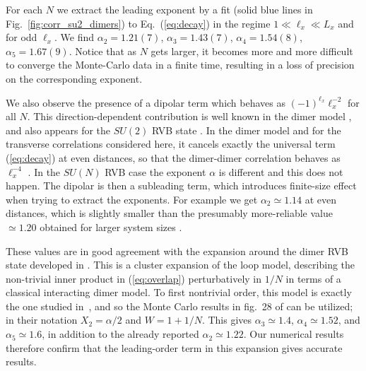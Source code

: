 \documentclass[11pt]{iopart}
\begin{document}
For each $N$ we extract the leading exponent by a fit (solid blue lines in Fig.~\ref{fig:corr_su2_dimers}) to Eq.~(\ref{eq:decay}) in the regime $1\ll \ell_x \ll L_x$ and for odd $\ell_x$. We find $\alpha_2=1.21(7)$, $\alpha_3=1.43(7)$, $\alpha_4=1.54(8)$, $\alpha_5=1.67(9)$. Notice that as $N$ gets larger, it becomes more and more difficult to converge the Monte-Carlo data in a finite time, resulting in a loss of precision on the corresponding exponent. 

We also observe the presence of a dipolar term which behaves as $(-1)^{\ell_x} \ell_x^{-2}$ for all $N$. This direction-dependent contribution is well known in the dimer model \cite{Alet_dimers2}, and also appears for the $SU(2)$ RVB state \cite{RVB2}. In the dimer model and for the transverse correlations considered here, it cancels exactly the universal term (\ref{eq:decay}) at even distances, so that the dimer-dimer correlation behaves as $\ell_x^{-4}$ \cite{FisherStephenson}. In the $SU(N)$ RVB case the exponent $\alpha$ is different and this does not happen. The dipolar is then a subleading term, which introduces finite-size effect when trying to extract the exponents. For example we get $\alpha_2\simeq 1.14$ at even distances, which is slightly smaller than the presumably more-reliable value $\simeq 1.20$ obtained for larger system sizes \cite{RVB1,RVB2}.

These values are in good agreement with the expansion around the dimer RVB state developed in \cite{Damle}. This is a cluster expansion of the loop model, describing the non-trivial inner product in (\ref{eq:overlap}) perturbatively in $1/N$ in terms of a classical interacting dimer model. 
To first nontrivial order, this model is exactly the one studied in \,\cite{Alet_dimers1,Alet_dimers2}, and so the Monte Carlo results in fig.\ 28 of \cite{Alet_dimers2} can be utilized; in their notation $X_2=\alpha/2$ and $W=1+1/N$. This gives $\alpha_3 \simeq 1.4$, $\alpha_4 \simeq 1.52$, and $\alpha_5\simeq 1.6$, in addition to the already reported $\alpha_2\simeq 1.22$. Our numerical results therefore confirm that the leading-order term in this expansion gives accurate results.
\end{document}

